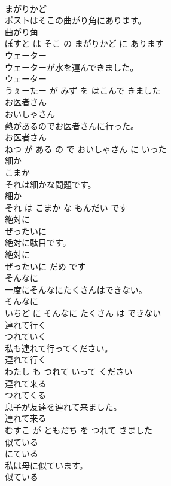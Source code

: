 \documentclass[8pt]{extreport}
\begin{document}
\begin{CJK}{UTF8}{min}
\\	まがりかど			
\\	ポストはそこの曲がり角にあります。	
\\	曲がり角 
\\	ぽすと は そこ の まがりかど に あります			
\\	ウェーター	
\\	ウェーターが水を運んできました。	
\\	ウェーター 
\\	うぇーたー が みず を はこんで きました			
\\	お医者さん	
\\	おいしゃさん			
\\	熱があるのでお医者さんに行った。	
\\	お医者さん 
\\	ねつ が ある の で おいしゃさん に いった			
\\	細か	
\\	こまか			
\\	それは細かな問題です。	
\\	細か 
\\	それ は こまか な もんだい です			
\\	絶対に	
\\	ぜったいに			
\\	絶対に駄目です。	
\\	絶対に 
\\	ぜったいに だめ です			
\\	そんなに	
\\	一度にそんなにたくさんはできない。	
\\	そんなに 
\\	いちど に そんなに たくさん は できない			
\\	連れて行く	
\\	つれていく			
\\	私も連れて行ってください。	
\\	連れて行く 
\\	わたし も つれて いって ください			
\\	連れて来る	
\\	つれてくる			
\\	息子が友達を連れて来ました。	
\\	連れて来る 
\\	むすこ が ともだち を つれて きました			
\\	似ている	
\\	にている			
\\	私は母に似ています。	
\\	似ている 

\end{CJK}
\end{document}
